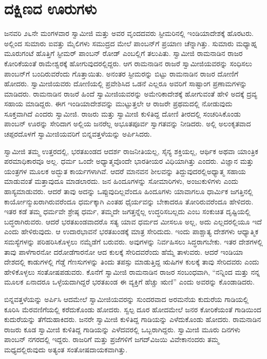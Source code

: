 
\chapter{ದಕ್ಷಿಣದ ಊರುಗಳು}

 ಜನವರಿ ೨೬ನೇ ಮಂಗಳವಾರ ಸ್ವಾಮೀಜಿ ಮತ್ತು ಅವರ ವೃಂದದವರು ಸ್ಟೀಮರಿನಲ್ಲಿ ಇಂಡಿಯಾದೇಶಕ್ಕೆ ಹೊರಟರು. ಅಲ್ಲಿಂದ ಸುಮಾರು ಐವತ್ತು ಮೈಲಿಗಳು ಸಮುದ್ರದ ಮೇಲೆ ಪಾಂಬನ್‌ಗೆ ಪ್ರಯಾಣ ಚೆನ್ನಾಗಿತ್ತು. ಸುಮಾರು ಮಧ್ಯಾಹ್ನ ಮೂರುಗಂಟೆ ಹೊತ್ತಿಗೆ ಸ್ಟೀಮರ್ ಪಾಂಬನ್ ರೋಡ್ ಎಂಬಲ್ಲಿಗೆ ತಲುಪಿತು. ಸ್ವಾಮೀಜಿ ರಾಮನಾಡಿನ ರಾಜರ ಕೋರಿಕೆಯಂತೆ ರಾಮೇಶ್ವರಕ್ಕೆ ಹೋಗುವುದರಲ್ಲಿದ್ದರು. ಆಗ ರಾಮನಾಡಿನ ರಾಜರೆ ಸ್ವಾಮೀಜಿಯವರನ್ನು ಸಂಧಿಸಲು ಪಾಂಬನ್‌ಗೆ ಬಂದಿರುವರೆಂದು ಗೊತ್ತಾಯಿತು. ಅನಂತರ ಸ್ಟೀಮರನ್ನು ಬಿಟ್ಟು ರಾಮನಾಡಿನ ರಾಜರ ದೋಣಿಗೆ ಹೋದರು. ಸ್ವಾಮೀಜಿಯವರು ದೋಣಿಯಲ್ಲಿ ಪ್ರವೇಶಿಸಿದ ಒಡನೆ ಎಲ್ಲರೂ ಅವರಿಗೆ ಸಾಷ್ಟಾಂಗ ಪ್ರಣಾಮಗಳನ್ನು ಮಾಡಿದರು. ರಾಮನಾಡಿನ ರಾಜರೆ ಹಿಂದೆ ಸ್ವಾಮೀಜಿಯವರನ್ನು ಅಮೇರಿಕಾದೇಶಕ್ಕೆ ಹೋಗುವಂತೆ ಹೇಳಿ ಅದಕ್ಕೆ ದ್ರವ್ಯ ಸಹಾಯ ಮಾಡಿದ್ದರು. ಈಗ ಇಂಡಿಯಾದೇಶವನ್ನು ಮುಟ್ಟುತ್ತಲೇ ಆ ರಾಜರೇ ಪ್ರಥಮದಲ್ಲಿ ನೋಡುವುದು ಸೂಕ್ತವಾಗಿದೆ ಎಂದರು ಸ್ವಾಮೀಜಿ. ರಾಜರು ಮತ್ತು ಸ್ವಾಮೀಜಿ ಕುಳಿತಿದ್ದ ದೋಣಿ ತೀರದಲ್ಲಿ ಸಂಚರಿಸಿಕೊಂಡು ಪಾಂಬನ್ ಊರನ್ನು ಸೇರಿದಾಗ ಅಲ್ಲಿಯ ಜನರೆಲ್ಲ ಅಭೂತಪೂರ್ವ ಸ್ವಾಗತವನ್ನು ನೀಡಿದರು. ಅಲ್ಲಿ ಅಲಂಕೃತವಾದ ಚಪ್ಪರದೊಳಗೆ ಸ್ವಾಮೀಜಿಯವರಿಗೆ ಬಿನ್ನವತ್ತಳೆಯನ್ನು ಅರ್ಪಿಸಿದರು. 

 ಸ್ವಾಮೀಜಿ ತಮ್ಮ ಉತ್ತರದಲ್ಲಿ, ಭರತಖಂಡದ ಆದರ್ಶ ರಾಜನೀತಿಯಲ್ಲ, ಸೈನ್ಯ ಶಕ್ತಿಯಲ್ಲ, ಆರ್ಥಿಕ ಅಥವಾ ಯಾಂತ್ರಿಕ ಪರಮಾಧಿಕಾರವೂ ಅಲ್ಲ. ಧರ್ಮ ಒಂದೇ ಅಧ್ಯಾತ್ಮವೊಂದೇ ಭಾರತೀಯರ ವಿಧಿಯಾಗಿತ್ತು ಎಂದರು. ವಿಜ್ಞಾನ ಮತ್ತು ಯಂತ್ರಗಳ ಮೂಲಕ ಅದ್ಭುತ ಕಾರ್ಯಗಳಾಗಿವೆ. ಆದರೆ ಮಾನವನ ಶೀಲವನ್ನು ತಿದ್ದುವುದರಲ್ಲಿ\break ಅಧ್ಯಾತ್ಮ ಸಹಾಯ ಮಾಡುವಂತೆ ಮತ್ತಾವುದೂ ಮಾಡಲಾರದು. ಜನ ಹಿಂದೂಗಳನ್ನು ಸೋಮಾರಿಗಳು, ಅಂಜುಕುಳಿಗಳು ಎಂದು ಹಾಸ್ಯಮಾಡುವರು. ಆದರೆ ತಾವು ಅದನ್ನು ಒಪ್ಪುವುದಿಲ್ಲವೆಂದೂ ಹಿಂದೂಗಳು ಯಾವಾಗಲೂ ಧಾರ್ಮಿಕ ಜಗತ್ತಿನಲ್ಲಿ ಕಾರ್ಯೋನ್ಮುಖರಾಗಿರುವರೆಂದೂ ಧರ್ಮಕ್ಕಾಗಿ ಎಂತಹ ಧೈರ್ಯವನ್ನು ಬೇಕಾದರೂ ತೋರಿರುವರೆಂದೂ ಹೇಳಿದರು. ಇತರ ಕಡೆ ತಮ್ಮ ಧರ್ಮವೇ ಶ್ರೇಷ್ಠ ಧರ್ಮ, ತಮ್ಮದೇ ಜಗತ್ತನ್ನೆಲ್ಲ ಉದ್ಧರಿಸಬಲ್ಲದು ಎಂಬ ಸಂಕುಚಿತ ದೃಷ್ಟಿಯಲ್ಲಿ ಬದ್ಧರಾಗಿರುವರು. ಆದರೆ ಭರತಖಂಡವಾದರೊ ಸತ್ಯ ಯಾವ ಧರ್ಮದ ಮೀಸಲೂ ಅಲ್ಲ, ಅದು ಎಲ್ಲದರಲ್ಲಿಯೂ ಇದೆ ಎಂದು ಹೇಳಿರುವುದು. ಆ ಉದಾರಭಾವನೆ ಭರತಖಂಡಕ್ಕೆ ಮಾತ್ರ ಸೇರಿದುದು. ಇಂದು ಪಾಶ್ಚಾತ್ಯ ದೇಶಗಳು ಆಧ್ಯಾತ್ಮಿಕ ಸಮಸ್ಯೆಗಳನ್ನು ಪರಿಹರಿಸಿಕೊಳ್ಳಲು ನಮ್ಮೆಡೆಗೆ ಬರುವರು. ಅವುಗಳನ್ನು ನಿರ್ವಹಿಸಲು ಸಿದ್ಧರಾಗಬೇಕು. ಇತರ ದೇಶಗಳಲ್ಲಿ ತಾವು ಪಾಳೆಗಾರನೋ ದರೋಡೆಗಾರನೋ ಆದ ಕುಲಕ್ಕೆ ಸೇರಿದವರೆಂದು ಹೆಮ್ಮೆ ತಾಳುವರು. ಆದರೆ ಇಂಡಿಯಾ ದೇಶದಲ್ಲಿ ಕಾಡುಗಳಲ್ಲಿ ಗೆಡ್ಡೆ ಗೆಣಸುಗಳನ್ನು ತಿಂದು ತಪಸ್ಸು ಮಾಡುತ್ತಿದ್ದ ಋಷಿಗಳ ಕುಲಕ್ಕೆ ತಾವು ಸೇರಿದವರು ಎಂದು ಹೇಳಿಕೊಳ್ಳಲು ಸಂತೋಷಪಡುವರು. ಕೊನೆಗೆ ಸ್ವಾಮೀಜಿ ರಾಮನಾಡಿನ ರಾಜರ ಸಂಬಂಧವಾಗಿ, “ನನ್ನಿಂದ ಮತ್ತು ನನ್ನ ಮೂಲಕ ಏನಾದರೂ ಒಳ್ಳೆಯದಾಗಿದ್ದರೆ ಭರತಖಂಡ ಈ ವ್ಯಕ್ತಿಗೆ ಹೆಚ್ಚು ಋಣಿ” ಎಂದು ಅವರನ್ನು ಕೊಂಡಾಡಿದರು. 

 ಬಿನ್ನವತ್ತಳೆಯನ್ನು ಅರ್ಪಿಸಿ ಆದಮೇಲೆ ಸ್ವಾಮೀಜಿಯವರನ್ನು ಸುಂದರವಾದ ಅರಮನೆಯ ಕುದುರೆಯ ಗಾಡಿಯಲ್ಲಿ ಕೂರಿಸಿ ಮೆರವಣಿಗೆಯಲ್ಲಿ ಕರೆದುಕೊಂಡು ಹೋದರು. ಸ್ವಲ್ಪ ದೂರ ಹೋದಮೇಲೆ ಜನರ ಕೋರಿಕೆಯಂತೆ ಗಾಡಿಯಿಂದ ಕುದುರೆಯನ್ನು ತೆಗೆದುಹಾಕಿದರು. ಜನರೇ ಸ್ವಾಮೀಜಿ ಕುಳಿತಿದ್ದ ಗಾಡಿಯನ್ನು ಎಳೆದುಕೊಂಡು ಹೋದರು. ರಾಮನಾಡಿನ ರಾಜರು ಕೂಡ ಸ್ವಾಮೀಜಿ ಕುಳಿತಿದ್ದ ಗಾಡಿಯನ್ನು ಎಳೆದವರಲ್ಲಿ ಒಬ್ಬರಾಗಿದ್ದರು. ಸ್ವಾಮೀಜಿ ಮೂರು ದಿನಗಳು ಪಾಂಬನ್ ನಗರದಲ್ಲಿ ಇದ್ದರು. ರಾಜರಿಗೆ ಮತ್ತು ಪ್ರಜೆಗಳಿಗೆ ಜಗದ್‌ವಿಜಯಿ ವಿವೇಕಾನಂದರು ತಮ್ಮ ಮಧ್ಯದಲ್ಲಿರುವುದು ಅತ್ಯಂತ ಸಂತೋಷದಾಯಕವಾಗಿತ್ತು. 

